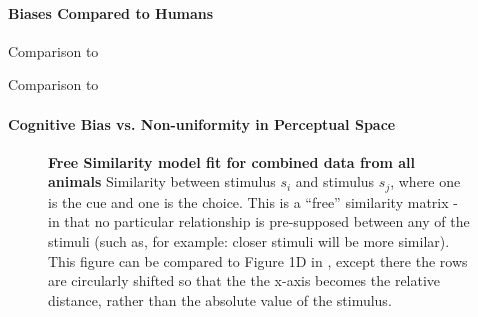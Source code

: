 \paragraph{Biases Compared to Humans}

Comparison to \cite{bae_why_2015}

Comparison to \cite{panichello_error-correcting_2019}

\paragraph{Cognitive Bias vs. Non-uniformity in Perceptual Space}

\begin{figure}

\caption{\textbf{Free Similarity model fit for combined data from all animals}
Similarity between stimulus $s_i$ and stimulus $s_j$, where one is the cue and one is the choice. This is a ``free'' similarity matrix - in that no particular relationship is pre-supposed between any of the stimuli (such as, for example: closer stimuli will be more similar). This figure can be compared to Figure 1D in \cite{schurgin_psychophysical_2020}, except there the rows are circularly shifted so that the the x-axis becomes the relative distance, rather than the absolute value of the stimulus. %
} 
\label{fig:SimilarityMatrixCombined}
\end{figure}

